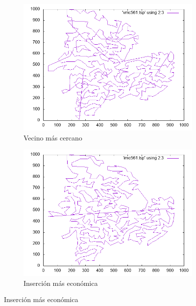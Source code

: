 \documentclass[12pt,spanish]{article}
\begin{document}
\begin{figure}[H]
\centering
\begin{subfigure}[b]{0.36\textwidth}
\includegraphics[width=\textwidth]{pa561_vmc.png}
\caption{Vecino más cercano}
\end{subfigure}
\quad
\begin{subfigure}[b]{0.36\textwidth}
\includegraphics[width=\textwidth]{pa561_ime.png}
\caption{Inserción más económica}
\end{subfigure}

\vspace{1cm}


\end{figure}
\end{document}

